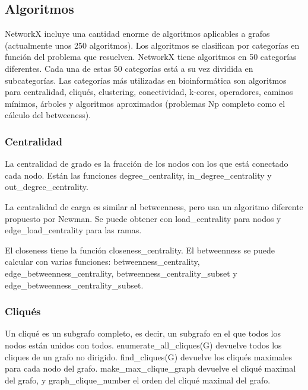 \subsection{Algoritmos}
NetworkX incluye una cantidad enorme de algoritmos aplicables a grafos (actualmente
unos 250 algoritmos). Los algoritmos se clasifican por categorías en función del problema que resuelven. NetworkX tiene algoritmos en 50 categorías diferentes. Cada una de estas 50 categorías está a su vez dividida en subcategorías. Las categorías más utilizadas en bioinformática son algoritmos para centralidad, cliqués, clustering, conectividad, k-cores, operadores, caminos mínimos, árboles y algoritmos aproximados (problemas Np completo como el cálculo del betweeness).

\subsubsection{Centralidad}
La centralidad de grado es la fracción de los nodos con los que está conectado cada nodo. Están las funciones degree\_centrality, in\_degree\_centrality y out\_degree\_centrality. 

La centralidad de carga es similar al betweenness, pero usa un algoritmo diferente propuesto por Newman. Se puede obtener con load\_centrality para nodos y edge\_load\_centrality para las ramas.

El closeness tiene la función closeness\_centrality. El betweenness se puede calcular con varias funciones: betweenness\_centrality, edge\_betweenness\_centrality, betweenness\_centrality\_subset y edge\_betweenness\_centrality\_subset.

\subsubsection{Cliqués}
Un cliqué es un subgrafo completo, es decir, un subgrafo en el que todos los nodos están unidos con todos. enumerate\_all\_cliques(G) devuelve todos los cliques de un grafo no dirigido. find\_cliques(G) devuelve los cliqués maximales para cada nodo del grafo. make\_max\_clique\_graph devuelve el cliqué maximal del grafo, y graph\_clique\_number el orden del cliqué maximal del grafo.
